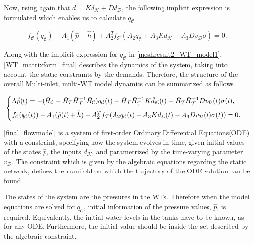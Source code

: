 Now, using again that $\bar{d} = K \bar{d}_{\mathcal{K}} + D \bar{d}_{\mathcal{D}}$, the following implicit expression is formulated which enables us to calculate $q_\mathcal{C}$

 \begin{equation}
\label{meshresult2_WT_model1}
f_{\mathcal{C}}(q_\mathcal{C}) - A_1(\hat{p} + \hat{h}) + A_2^T f_{\mathcal{T}}(A_2 q_\mathcal{C} + A_3 K \bar{d}_{\mathcal{K}} - A_3 D v_{\mathcal{D}} \sigma) = 0.
\end{equation} 

Along with the implicit expression for $q_\mathcal{C}$ in \eqref{meshresult2_WT_model1}, \eqref{WT_matrixform_final} describes the dynamics of the system, taking into account the static constraints by the demands. Therefore, the structure of the overall Multi-inlet, multi-WT model dynamics can be summarized as follows

\begin{equation}
\label{final_flowmodel}
\begin{cases}
    \Lambda \dot{\hat{p}}(t) = - (\hat{H}_{\mathcal{C}} - \hat{H}_{\mathcal{T}} \bar{H}^{-1}_{\mathcal{T}}\bar{H}_{\mathcal{C}})  q_\mathcal{C}(t)  - \hat{H}_{\mathcal{T}} \bar{H}^{-1}_{\mathcal{T}} K \bar{d}_{\mathcal{K}}(t) + \hat{H}_{\mathcal{T}} \bar{H}^{-1}_{\mathcal{T}} D v_{\mathcal{D}}(t) \sigma(t), \vspace{2mm}\\
    f_{\mathcal{C}}(q_\mathcal{C}(t)) - A_1(\hat{p}(t) + \hat{h}) + A_2^T f_{\mathcal{T}}(A_2 q_\mathcal{C}(t) + A_3 K \bar{d}_{\mathcal{K}}(t) - A_3 D v_{\mathcal{D}}(t) \sigma(t)) = 0.
\end{cases}
\end{equation}

\eqref{final_flowmodel} is a system of first-order Ordinary Differential Equations(ODE) with a constraint, specifying how the system evolves in time, given initial values of the states $\hat{p}$, the inputs $\bar{d}_{\mathcal{K}}$, and parametrized by the time-varying parameter $v_{\mathcal{D}}$. The constraint which is given by the algebraic equations regarding the static network, defines the manifold on which the trajectory of the ODE solution can be found. 

The states of the system are the pressures in the WTs. Therefore when the model equations are solved for $q_\mathcal{C}$, initial information of the pressure values, $\hat{p}$, is required. Equivalently, the initial water levels in the tanks have to be known, as for any ODE. Furthermore, the initial value should be inside the set described by the algebraic constraint. 

